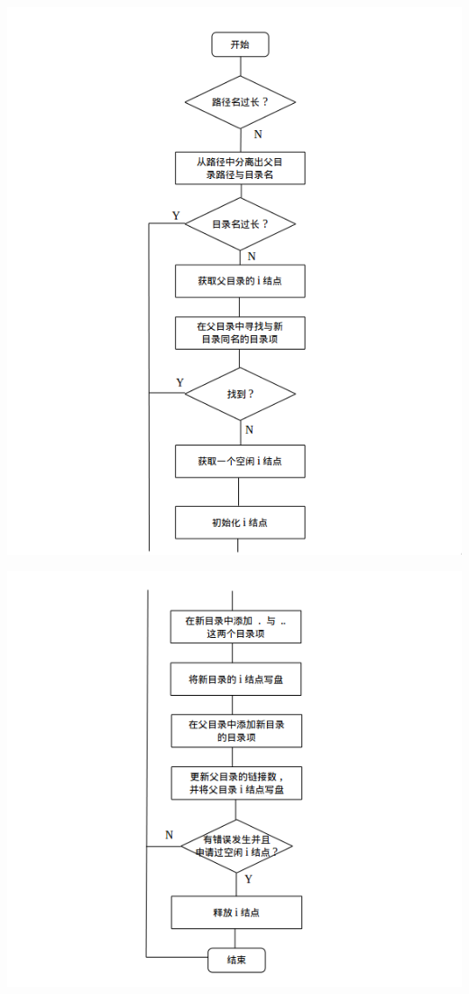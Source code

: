\documentclass[nofonts]{ctexart}
\begin{document}
\begin{itemize}
  \includegraphics[width=15cm]{./images/./mkdir_1.png}

  \includegraphics[width=15cm]{./images/./mkdir_2.png}
  \end{itemize}
\end{document}
